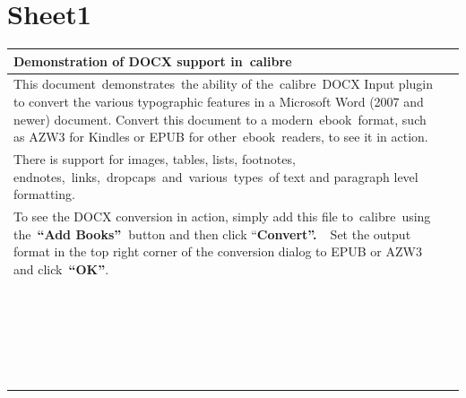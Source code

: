 \documentclass[\officeparserdriver 12pt]{article}
\begin{document}
\section{Sheet1}

\begin{longtable}{|*{2}{>{\raggedright\arraybackslash}p{\dimexpr(\linewidth-4\tabcolsep-3\arrayrulewidth)/2\relax}|}}
\hline
\textcolor{hex17365D}{{\fontsize{26pt}{31.2pt}\selectfont Demonstration of DOCX support in~calibre~}} &  \\
\hline
This document~demonstrates~the ability of the~\textcolor{hex000000}{calibre}~DOCX Input plugin to convert the various typographic features in a Microsoft Word (2007 and newer) document. Convert this document to a modern~ebook~format, such as AZW3 for Kindles or EPUB for other~ebook~readers, to see it in action.~ &  \\
\hline
There is support for images, tables, lists, footnotes, endnotes,~links,~dropcaps~and~various~types~of text and paragraph level formatting.~ &  \\
\hline
To see the DOCX conversion in action, simply add this file to~calibre~using the~\textbf{“Add Books”~}button and then click “\textbf{Convert”.~}~Set the output format in the top right corner of the conversion dialog to EPUB or AZW3 and click~\textbf{“OK”}.~ &  \\
\hline
 &  \\
\hline
 &  \\
\hline
 &  \\
\hline
 &  \\
\hline
 &  \\
\hline
 &  \\
\hline
 &  \\
\hline
 &  \\
\hline
 &  \\
\hline
 &  \\
\hline
 &  \\
\hline
 &  \\
\hline
 &  \\
\hline
 &  \\
\hline
 &  \\
\hline
 &  \\
\hline
 &  \\
\hline
 &  \\
\hline
 &  \\
\hline
 &  \\
\hline
 &  \\
\hline
 &  \\
\hline
 &  \\

\end{longtable}
\end{document}
